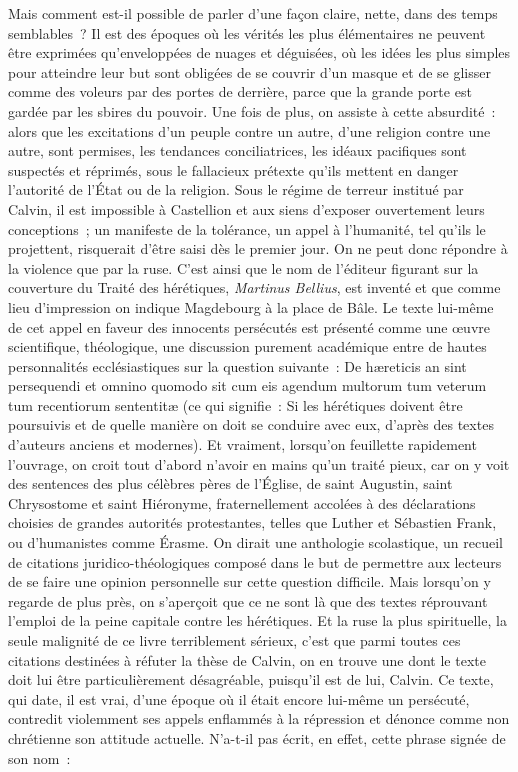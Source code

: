 \documentclass[french,twoside]{book} %
\begin{document}
Mais comment est-il possible de parler d’une façon claire, nette, dans des temps semblables ? Il est des époques où les vérités les plus élémentaires ne peuvent être exprimées qu’enveloppées de nuages et déguisées, où les idées les plus simples pour atteindre leur but sont obligées de se couvrir d’un masque et de se glisser comme des voleurs par des portes de derrière, parce que la grande porte est gardée par les sbires du pouvoir. Une fois de plus, on assiste à cette absurdité : alors que les excitations d’un peuple contre un autre, d’une religion contre une autre, sont permises, les tendances conciliatrices, les idéaux pacifiques sont suspectés et réprimés, sous le fallacieux prétexte qu’ils mettent en danger l’autorité de l’État ou de la religion. Sous le régime de terreur institué par Calvin, il est impossible à Castellion et aux siens d’exposer ouvertement leurs conceptions ; un manifeste de la tolérance, un appel à l’humanité, tel qu’ils le projettent, risquerait d’être saisi dès le premier jour. On ne peut donc répondre à la violence que par la ruse. C’est ainsi que le nom de l’éditeur figurant sur la couverture du Traité des hérétiques, \emph{Martinus Bellius}, est inventé et que comme lieu d’impression on indique Magdebourg à la place de Bâle. Le texte lui-même de cet appel en faveur des innocents persécutés est présenté comme une œuvre scientifique, théologique, une discussion purement académique entre de hautes personnalités ecclésiastiques sur la question suivante : De hæreticis an sint persequendi et omnino quomodo sit cum eis agendum multorum tum veterum tum recentiorum sententitæ (ce qui signifie : Si les hérétiques doivent être poursuivis et de quelle manière on doit se conduire avec eux, d’après des textes d’auteurs anciens et modernes). Et vraiment, lorsqu’on feuillette rapidement l’ouvrage, on croit tout d’abord n’avoir en mains qu’un traité pieux, car on y voit des sentences des plus célèbres pères de l’Église, de saint Augustin, saint Chrysostome et saint Hiéronyme, fraternellement accolées à des déclarations choisies de grandes autorités protestantes, telles que Luther et Sébastien Frank, ou d’humanistes comme Érasme. On dirait une anthologie scolastique, un recueil de citations juridico-théologiques composé dans le but de permettre aux lecteurs de se faire une opinion personnelle sur cette question difficile. Mais lorsqu’on y regarde de plus près, on s’aperçoit que ce ne sont là que des textes réprouvant l’emploi de la peine capitale contre les hérétiques. Et la ruse la plus spirituelle, la seule malignité de ce livre terriblement sérieux, c’est que parmi toutes ces citations destinées à réfuter la thèse de Calvin, on en trouve une dont le texte doit lui être particulièrement désagréable, puisqu’il est de lui, Calvin. Ce texte, qui date, il est vrai, d’une époque où il était encore lui-même un persécuté, contredit violemment ses appels enflammés à la répression et dénonce comme non chrétienne son attitude actuelle. N’a-t-il pas écrit, en effet, cette phrase signée de son nom :\par
\end{document}
